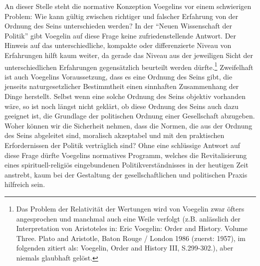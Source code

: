 An dieser Stelle steht die normative Konzeption Voegelins vor einem
schwierigen Problem: Wie kann gültig zwischen richtiger und falscher Erfahrung
von der Ordnung des Seins unterschieden werden? In der "`Neuen Wissenschaft
der Politik"' gibt Voegelin auf diese Frage keine zufriedenstellende Antwort.
Der Hinweis auf das unterschiedliche, kompakte oder differenzierte Niveau von
Erfahrungen hilft kaum weiter, da gerade das Niveau aus der jeweiligen Sicht
der unterschiedlichen Erfahrungen gegensätzlich beurteilt werden
dürfte.\footnote{Das Problem der Relativität der Wertungen wird von Voegelin
  zwar öfters angesprochen und manchmal auch eine Weile verfolgt (z.B.
  anlässlich der Interpretation von Aristoteles in: Eric Voegelin: Order and
  History. Volume Three. Plato and Aristotle, Baton Rouge / London 1986
  (zuerst: 1957), im folgenden zitiert als: Voegelin, Order and History III,
  S.299-302.), aber niemals glaubhaft gelöst.}  Zweifelhaft ist auch Voegelins
Voraussetzung, dass es eine Ordnung des Seins gibt, die jenseits
naturgesetzlicher Bestimmtheit einen sinnhaften Zusammenhang der Dinge
herstellt. Selbst wenn eine solche Ordnung des Seins objektiv vorhanden wäre,
so ist noch längst nicht geklärt, ob diese Ordnung des Seins auch dazu
geeignet ist, die Grundlage der politischen Ordnung einer Gesellschaft
abzugeben. Woher können wir die Sicherheit nehmen, dass die Normen, die aus der
Ordnung des Seins abgeleitet sind, moralisch akzeptabel und mit den
praktischen Erfordernissen der Politik verträglich sind? Ohne eine schlüssige
Antwort auf diese Frage dürfte Voegelins normatives Programm, welches die
Revitalisierung eines spirituell-religiös eingebundenen Politikverständnisses
in der heutigen Zeit anstrebt, kaum bei der Gestaltung der gesellschaftlichen
und politischen Praxis hilfreich sein.

